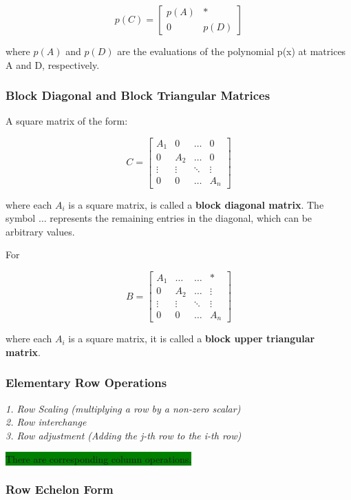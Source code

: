 \documentclass[12pt]{article}
\newcommand{\mybox}[2][black]{\colorbox{#1}{#2}}
\begin{document}
\[
p(C) = \begin{bmatrix}
p(A) & * \\
0 & p(D)
\end{bmatrix}
\]

where \(p(A)\) and \(p(D)\) are the evaluations of the polynomial p(x) at matrices A and D, respectively. 


\subsubsection{Block Diagonal and Block Triangular Matrices}

A square matrix of the form:

\[
C = \begin{bmatrix}
A_1 & 0 & \ldots & 0 \\
0 & A_2 & \ldots & 0 \\
\vdots & \vdots & \ddots & \vdots \\
0 & 0 & \ldots & A_n
\end{bmatrix}
\]

where each \(A_i\) is a square matrix, is called a \textbf{block diagonal matrix}. The symbol \(\ldots\) represents the remaining entries in the diagonal, which can be arbitrary values.

For

\[
B = \begin{bmatrix}
A_1 & \ldots & \ldots & * \\
0 & A_2 & \ldots & \vdots \\
\vdots & \vdots & \ddots & \vdots \\
0 & 0 & \ldots & A_n
\end{bmatrix}
\]

where each \(A_i\) is a square matrix, it is called a \textbf{block upper triangular matrix}.

\subsubsection{Elementary Row Operations}

\textit{1. Row Scaling (multiplying a row by a non-zero scalar)\\
2. Row interchange\\
3. Row adjustment (Adding the j-th row to the i-th row)}

\mybox[green]{There are corresponding column operations.}

\subsubsection{Row Echelon Form}
\end{document}

